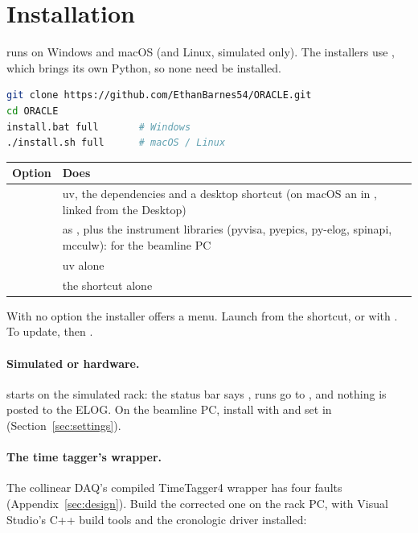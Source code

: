 \section{Installation}
\label{sec:installation}

\oracle{} runs on Windows and macOS (and Linux, simulated only). The installers use
, which brings its own Python, so none need be installed.

\begin{lstlisting}[language=bash]
git clone https://github.com/EthanBarnes54/ORACLE.git
cd ORACLE
install.bat full       # Windows
./install.sh full      # macOS / Linux
\end{lstlisting}

\begin{center}
\begin{tabularx}{\textwidth}{@{}lL@{}}
\toprule
Option & Does \\
\midrule
{}     & uv, the dependencies and a desktop shortcut (on macOS an 
                  in , linked from the Desktop) \\
     & as , plus the instrument libraries (pyvisa, pyepics, py-elog,
                  spinapi, mcculw): for the beamline PC \\
       & uv alone \\
 & the shortcut alone \\
\bottomrule
\end{tabularx}
\end{center}

With no option the installer offers a menu. Launch from the shortcut, or with
. To update,  then .

\paragraph{Simulated or hardware.}
\oracle{} starts on the simulated rack: the status bar says , runs go
to , and nothing is posted to the ELOG. On the beamline PC, install
with  and set  in 
(Section~\ref{sec:settings}).

\paragraph{The time tagger's wrapper.}
The collinear DAQ's compiled TimeTagger4 wrapper has four faults (Appendix~\ref{sec:design}).
Build the corrected one on the rack PC, with Visual Studio's C++ build tools and the
cronologic driver installed:

